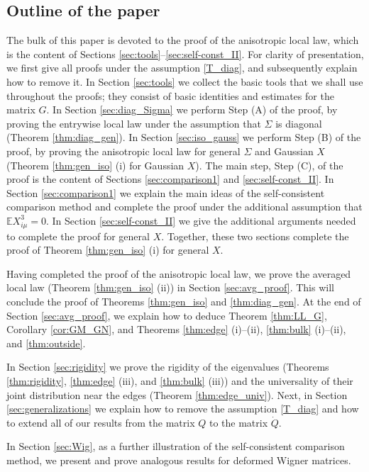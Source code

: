 \documentclass[11pt]{article} %
\numberwithin{equation}{section}
\numberwithin{figure}{section}
\theoremstyle{plain} %
\theoremstyle{definition} %
\newcommand{\E}{\mathbb{E}}
\begin{document}
\subsection{Outline of the paper} \label{sec:outline}
The bulk of this paper is devoted to the proof of the anisotropic local law, which is the content of Sections \ref{sec:tools}--\ref{sec:self-const_II}. For clarity of presentation, we first give all proofs under the assumption \eqref{T_diag}, and subsequently explain how to remove it. In Section \ref{sec:tools} we collect the basic tools that we shall use throughout the proofs; they consist of basic identities and estimates for the matrix $G$. In Section \ref{sec:diag_Sigma} we perform Step (A) of the proof, by proving the entrywise local law under the assumption that $\Sigma$ is diagonal (Theorem \ref{thm:diag_gen}). In Section \ref{sec:iso_gauss} we perform Step (B) of the proof, by proving the anisotropic local law for general $\Sigma$ and Gaussian $X$ (Theorem \ref{thm:gen_iso} (i) for Gaussian $X$). The main step, Step (C), of the proof is the content of Sections \ref{sec:comparison1} and \ref{sec:self-const_II}. In Section \ref{sec:comparison1} we explain the main ideas of the self-consistent comparison method and complete the proof under the additional assumption that $\E X_{i \mu}^3 = 0$. In Section \ref{sec:self-const_II} we give the additional arguments needed to complete the proof for general $X$. Together, these two sections complete the proof of Theorem \ref{thm:gen_iso} (i) for general $X$.

Having completed the proof of the anisotropic local law, we prove the averaged local law (Theorem \ref{thm:gen_iso} (ii)) in Section \ref{sec:avg_proof}. This will conclude the proof of Theorems \ref{thm:gen_iso} and \ref{thm:diag_gen}. At the end of Section \ref{sec:avg_proof}, we explain how to deduce Theorem \ref{thm:LL_G}, Corollary \ref{cor:GM_GN}, and Theorems \ref{thm:edge} (i)--(ii), \ref{thm:bulk} (i)--(ii), and \ref{thm:outside}.

In Section \ref{sec:rigidity} we prove the rigidity of the eigenvalues (Theorems \ref{thm:rigidity}, \ref{thm:edge} (iii), and \ref{thm:bulk} (iii)) and the universality of their joint distribution near the edges (Theorem \ref{thm:edge_univ}). Next, in Section \ref{sec:generalizations} we explain how to remove the assumption \eqref{T_diag} and how to extend all of our results from the matrix $Q$ to the matrix $\dot Q$.

In Section \ref{sec:Wig}, as a further illustration of the self-consistent comparison method, we present and prove analogous results for deformed Wigner matrices.
\end{document}
